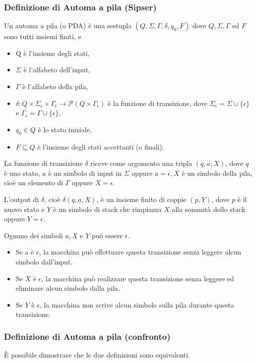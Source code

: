 \subsubsection{Definizione di Automa a pila (Sipser)}
Un automa a pila (o PDA) è una sestupla
$\left(Q, \Sigma, \Gamma, \delta, q_{0}, F\right)$ dove $Q, \Sigma, \Gamma$ ed $F$ sono tutti insiemi finiti, e
\begin{itemize}
    \item  Q è l'insieme degli stati,
    \item $\Sigma$ è l'alfabeto dell'input,
    \item $\Gamma$ è l'alfabeto della pila,
    \item $\delta: Q \times \Sigma_{\epsilon} \times \Gamma_{\epsilon} \rightarrow \mathcal{P}\left(Q \times \Gamma_{\epsilon}\right)$ è la funzione di transizione, dove $\Sigma_{\epsilon}=\Sigma \cup\{\epsilon\}$ e $\Gamma_{\epsilon}=\Gamma \cup\{\epsilon\}$,
    \item $q_{0} \in Q$ è lo stato iniziale,
    \item $F \subseteq Q$ è l'insieme degli stati accettanti (o finali).
\end{itemize}
La funzione di transizione $\delta$ riceve come argomento una tripla $(q, a, X)$, dove $q$ è uno stato, $a$ è un simbolo di input in $\Sigma$ oppure $a=\epsilon, X$ è un simbolo della pila, cioè un elemento di $\Gamma$ oppure $X=\epsilon$.

\vspace{5mm}

L'output di $\delta$, cioè $\delta(q, a, X)$, è un insieme finito di coppie $(p, Y)$, dove $p$ è il nuovo stato e $Y$ è un simbolo di stack che rimpiazza $X$ alla sommità dello stack oppure $Y=\epsilon$.


Ognuno dei simboli $a, X$ e $Y$ può essere $\epsilon$. 
\begin{itemize}
    \item Se a è $\epsilon$, la macchina può effettuare questa transizione senza leggere alcun simbolo dall'input.
    \item Se $X$ è $\epsilon$, la macchina può realizzare questa transizione senza leggere ed eliminare alcun simbolo dalla pila.
    \item Se $Y$ è $\epsilon$, la macchina non scrive alcun simbolo sulla pila durante questa transizione.
\end{itemize}

\subsubsection{Definizione di Automa a pila (confronto)}
È possibile dimostrare che le due definizioni sono equivalenti.

